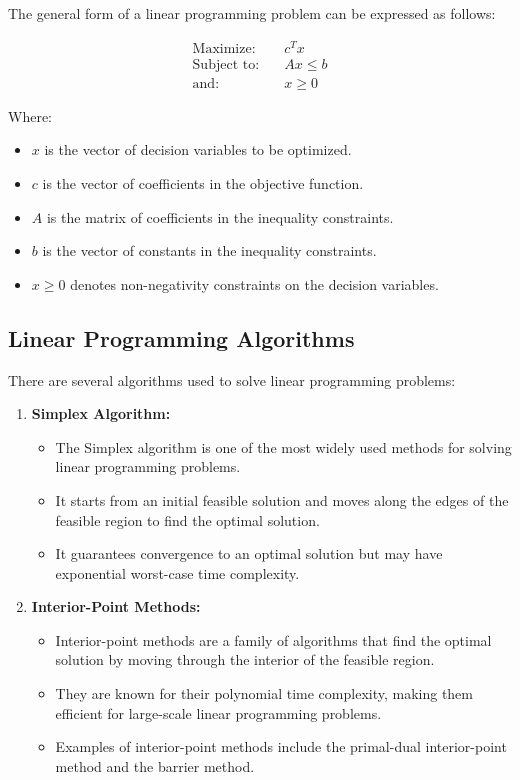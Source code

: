\documentclass[a4paper]{article}
\begin{document}
The general form of a linear programming problem can be expressed as follows:

\begin{align*}
\text{Maximize:} \quad & c^Tx \\
\text{Subject to:} \quad & Ax \leq b \\
\text{and:} \quad & x \geq 0
\end{align*}

Where:
\begin{itemize}
    \item \(x\) is the vector of decision variables to be optimized.
    \item \(c\) is the vector of coefficients in the objective function.
    \item \(A\) is the matrix of coefficients in the inequality constraints.
    \item \(b\) is the vector of constants in the inequality constraints.
    \item \(x \geq 0\) denotes non-negativity constraints on the decision variables.
\end{itemize}

\subsection{Linear Programming Algorithms}

There are several algorithms used to solve linear programming problems:

\begin{enumerate}
    \item \textbf{Simplex Algorithm:}
    \begin{itemize}
        \item The Simplex algorithm is one of the most widely used methods for solving linear programming problems.
        \item It starts from an initial feasible solution and moves along the edges of the feasible region to find the optimal solution.
        \item It guarantees convergence to an optimal solution but may have exponential worst-case time complexity.
    \end{itemize}
    
    \item \textbf{Interior-Point Methods:}
    \begin{itemize}
        \item Interior-point methods are a family of algorithms that find the optimal solution by moving through the interior of the feasible region.
        \item They are known for their polynomial time complexity, making them efficient for large-scale linear programming problems.
        \item Examples of interior-point methods include the primal-dual interior-point method and the barrier method.
    \end{itemize}
\end{enumerate}
\end{document}
